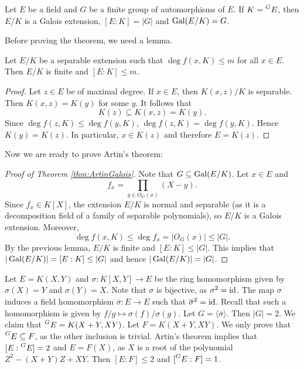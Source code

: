 \begin{theorem}[Artin]
\label{thm:ArtinGalois}
    Let $E$ be a field and $G$ be a finite group of automorphisms of $E$. 
    If $K=\prescript{G}{}{E}$, then $E/K$ is a Galois extension,
    $[E:K]=|G|$ and $\operatorname{Gal}(E/K)=G$. 
\end{theorem}

Before proving the theorem, we need a lemma.

\begin{lemma}
    Let $E/K$ be a separable extension such that $\deg f(x,K)\leq m$
    for all $x\in E$. Then $E/K$ is finite and $[E:K]\leq m$. 
\end{lemma}

\begin{proof}
   Let $z\in E$ be of maximal degree. If $x\in E$, 
   then $K(x,z)/K$ is separable. Then $K(x,z)=K(y)$ for some $y$. 
   It follows that 
   \[
   K(z)\subseteq K(x,z)=K(y).
   \]
   Since 
   $\deg f(z,K)\leq\deg f(y,K)$, 
   $\deg f(z,K)=\deg f(y,K)$. Hence 
   $K(y)=K(z)$. In particular, $x\in K(z)$ and
   therefore $E=K(z)$. 
\end{proof}

Now we are ready to prove Artin's theorem: 

\begin{proof}[Proof of Theorem \ref{thm:ArtinGalois}]
    Note that $G\subseteq\operatorname{Gal}(E/K)$. Let $x\in E$ and 
    \[
    f_x=\prod_{y\in O_G(x)}(X-y).
    \]
    Since $f_x\in K[X]$, the extension $E/K$ is normal and separable (as it is a decomposition
    field of a family of separable polynomials), so $E/K$ is a Galois extension. Moreover, 
    \[
    \deg f(x,K)\leq \deg f_x=|O_G(x)|\leq |G|.
    \]
    By the previous lemma, $E/K$ is finite and $[E:K]\leq |G|$. This
    implies that
    $|\operatorname{Gal}(E/K)|=[E:K]\leq |G|$ and hence $|\operatorname{Gal}(E/K)|=|G|$. 
\end{proof}

\begin{example}
    Let $E=K(X,Y)$ and $\sigma\colon K[X,Y]\to E$ be the ring homomorphism given by $\sigma(X)=Y$ and $\sigma(Y)=X$. Note that $\sigma$ is bijective, as $\sigma^2=\operatorname{id}$. The map $\sigma$ induces
    a field homomorphism $\overline{\sigma}\colon E\to E$ such that 
    $\overline{\sigma}^2=\operatorname{id}$. Recall that such a homomorphism is given by 
    $f/g\mapsto \sigma(f)/\sigma(g)$. Let $G=\langle\overline{\sigma}\rangle$. Then $|G|=2$. 
    We claim that $\prescript{G}{}{E}=K(X+Y,XY)$. Let $F=K(X+Y,XY)$. We only prove
    that $\prescript{G}{}{E}\subseteq F$, as the other inclusion is trivial. Artin's theorem
    implies that $[E:\prescript{G}{}{E}]=2$ and $E=F(X)$, as $X$ is a root
    of the polynomial $Z^2-(X+Y)Z+XY$. Then $[E:F]\leq 2$ and $[\prescript{G}{}{E}:F]=1$.
\end{example}
